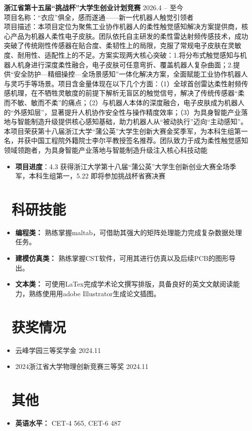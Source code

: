 \documentclass[11pt]{article}
\newlength{\intraProjectTitleSep}
\newcommand{\titlebreak}{\\[\intraProjectTitleSep]}
\newlength{\intraProjectListTopSep}
\begin{document}
\textbf{浙江省第十五届“挑战杯”大学生创业计划竞赛} \hfill 2026.4 -- 至今 \titlebreak
项目名称：“衣应”俱全，感而遂通——新一代机器人触觉引领者 \\
项目描述：本项目定位为聚焦工业协作机器人的柔性触觉感知解决方案提供商，核心产品为机器人柔性电子皮肤。团队依托自主研发的柔性雷达射频传感技术，成功突破了传统刚性传感器在贴合度、柔韧性上的局限，克服了常规电子皮肤在灵敏度、耐用性、适配性上的不足。方案实现两大核心突破：1.将分布式触觉感知与机器人机身进行深度柔性融合，电子皮肤可任意弯折、覆盖机器人复杂曲面；2.提供“安全防护—精细操控—全场景感知”一体化解决方案，全面赋能工业协作机器人与灵巧手等场景。项目含金量体现在以下几个方面：（1）全球首创雷达柔性射频传感机理，在不牺牲灵敏度的前提下解析无盲区的触觉信号，解决了传统传感器“柔而不敏、敏而不柔”的痛点；（2）与机器人本体的深度融合，电子皮肤成为机器人的“外感知层”，显著提升人机协作安全性与操作精度效率；（3）为具身智能产业落地与智能制造升级提供核心感知基础，助力机器人从“被动执行”迈向“主动感知”。本项目荣获第十八届浙江大学“蒲公英”大学生创新大赛金奖季军，为本科生组第一名，并获中国工程院外籍院士李尔平教授签名推荐。团队致力于成为柔性触觉感知领域领跑者，为具身智能产业落地与智能制造升级注入核心科技动能
\begin{itemize}[nosep, topsep=\intraProjectListTopSep]
    \item \textbf{项目进度}：4.3 获得浙江大学第十八届“蒲公英”大学生创新创业大赛全场季军，本科生组第一，5.22 即将参加挑战杯省赛决赛
\end{itemize}

\section{\makebox[\widthof{\faCogs}][c]{\color{CVBlue}\faCogs}\ 科研技能}
\begin{itemize}[nosep]
    \item \textbf{编程类：} 熟练掌握maltab，可借助其强大的矩阵处理能力完成复杂数据处理任务。
    \item \textbf{建模仿真类：} 熟练掌握CST软件，可用其进行仿真以及后续PCB的图形导出。
    \item \textbf{文本类：} 可使用LaTex完成学术论文撰写排版，具备良好的英文文献阅读能力，熟练使用用adobe Illustrator生成论文插图。
\end{itemize}
\section{\makebox[\widthof{\faGraduationCap}][c]{\color{CVBlue}\faList}\ 获奖情况}
\begin{itemize}
    \item 云峰学园三等奖学金 \hfill 2024.11
    \item 2024浙江省大学物理创新竞赛三等奖 \hfill 2024.11
\end{itemize}
    
\section{\makebox[\widthof{\faInfo}][c]{\color{CVBlue}\faInfo}\ 其他}
\begin{itemize}[parsep=0.5ex]
    \item \textbf{英语水平：} CET-4 565, CET-6 487
\end{itemize}
\end{document}
